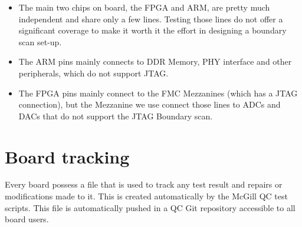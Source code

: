 \documentclass[11pt,article]{memoir}
\begin{document}
\begin{itemize}
	\item The main two chips on board, the FPGA and ARM, are pretty much
       independent and share only a few lines. Testing those lines do not
       offer a significant coverage to make it worth it the effort in
       designing a boundary scan  set-up.

	\item The ARM pins mainly connects to DDR Memory, PHY interface and other
       peripherals, which do not support JTAG.

	\item The FPGA pins mainly connect to the FMC Mezzanines (which has a JTAG
       connection), but the Mezzanine we use connect those lines to ADCs and
       DACs that do not support the JTAG Boundary scan.
\end{itemize}


\section{Board tracking}

Every board possess a file that is used to track any test result and repairs
or modifications made to it. This is created automatically by the McGill QC
test scripts. This file is automatically pushed in a QC Git repository
accessible to all board users.






\end{document}
